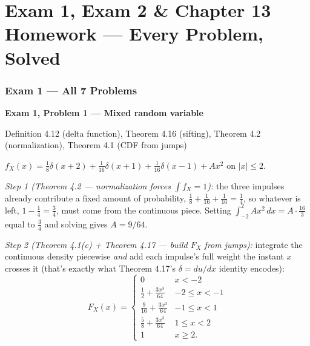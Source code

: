 \documentclass[10pt]{article}
\newcommand{\exambox}[3]{%
  \par\vspace{7pt}\noindent{\color{examcol}\rule{\linewidth}{1.1pt}}\par\vspace{2pt}
  \noindent\textbf{\color{examcol}#1}\par\smallskip
  \noindent{\small\color{notecol}\textbf{Theorems/tools used:}} \small #2\par\smallskip\noindent
  #3\par
}
\begin{document}
\clearpage
\part{Exam 1, Exam 2 \& Chapter 13 Homework --- Every Problem, Solved}
\label{part:exams}
\section{Exam 1 --- All 7 Problems}

\exambox{Exam 1, Problem 1 --- Mixed random variable}{
Definition 4.12 (delta function), Theorem 4.16 (sifting), Theorem 4.2 (normalization),
Theorem 4.1 (CDF from jumps)}{
$f_X(x)=\tfrac18\delta(x{+}2)+\tfrac1{16}\delta(x{+}1)+\tfrac1{16}\delta(x{-}1)+Ax^2$ on
$|x|\le2$.

\textit{Step 1 (Theorem 4.2 --- normalization forces $\int f_X=1$):} the three impulses
already contribute a fixed amount of probability, $\tfrac18+\tfrac1{16}+\tfrac1{16}=\tfrac14$,
so whatever is left, $1-\tfrac14=\tfrac34$, must come from the continuous piece. Setting
$\int_{-2}^2 Ax^2\,dx=A\cdot\tfrac{16}3$ equal to $\tfrac34$ and solving gives
$\boxed{A=9/64}$.

\textit{Step 2 (Theorem 4.1(c) + Theorem 4.17 --- build $F_X$ from jumps):} integrate the
continuous density piecewise \emph{and} add each impulse's full weight the instant $x$ crosses
it (that's exactly what Theorem 4.17's $\delta=du/dx$ identity encodes):
\[
F_X(x)=\begin{cases}0&x<-2\\ \tfrac12+\tfrac{3x^3}{64}&-2\le x<-1\\
\tfrac9{16}+\tfrac{3x^3}{64}&-1\le x<1\\ \tfrac58+\tfrac{3x^3}{64}&1\le x<2\\1&x\ge2.\end{cases}
\]

}
\end{document}
